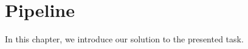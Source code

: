 \chapter{Pipeline}

\label{kap:pipeline} %

In this chapter, we introduce our solution to the presented task.